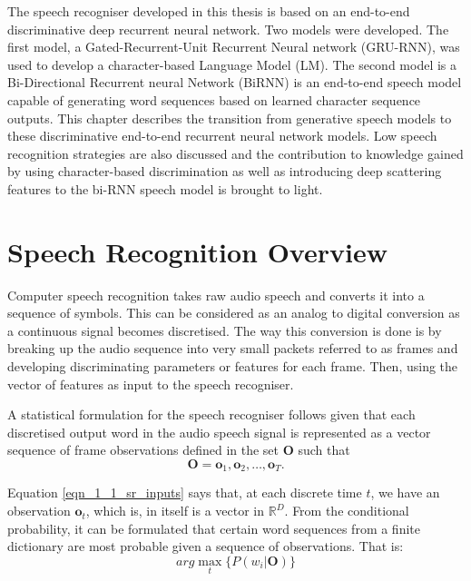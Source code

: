 The speech recogniser developed in this thesis is based on an end-to-end discriminative deep recurrent neural network.  Two models were developed.  The first model, a Gated-Recurrent-Unit Recurrent Neural network (GRU-RNN), was used to develop a character-based Language Model (LM).  The second model is a Bi-Directional Recurrent neural Network (BiRNN) is an end-to-end speech model capable of generating word sequences based on learned character sequence outputs.  This chapter describes the transition from generative speech models to these discriminative end-to-end recurrent neural network models.  Low speech recognition strategies are also discussed and the contribution to knowledge gained by using character-based discrimination as well as introducing deep scattering features to the bi-RNN speech model is brought to light.

\section{Speech Recognition Overview}\label{Ch_2_SROverview}
Computer speech recognition takes raw audio speech and converts it into a sequence of symbols.  This can be considered as an analog to digital conversion as a continuous signal becomes discretised.  The way this conversion is done is by breaking up the audio sequence into very small packets referred to as frames and developing discriminating parameters or features for each frame. Then, using the vector of features as input to the speech recogniser.  

A statistical formulation \citep{young2002htk} for the speech recogniser follows given that each discretised output word in the audio speech signal is represented as a vector sequence of frame observations defined in the set $\mathbf{O}$ such that 
\begin{equation}\mathbf{O}=\mathbf{o}_1,\mathbf{o}_2,\dots,\mathbf{o}_T.
\label{eqn_1_1_sr_inputs}
\end{equation}

Equation \ref{eqn_1_1_sr_inputs} says that, at each discrete time $t$, we have an observation $\mathbf{o}_t$, which is, in itself is a vector in $\mathbb{R}^D$.  From the conditional probability, it can be formulated that certain word sequences from a finite dictionary are most probable given a sequence of observations. That is:
\begin{equation}arg\max_t\{P(w_i|\mathbf{O})\}
\label{eqn_2_2_srgen}
\end{equation}

